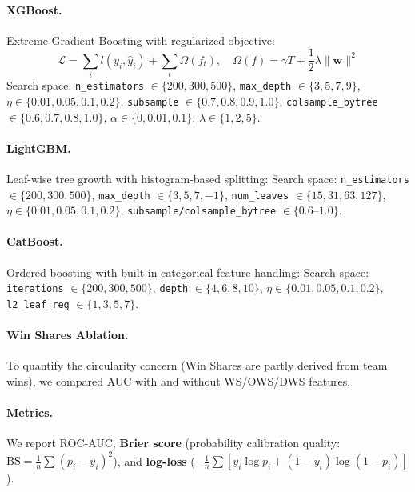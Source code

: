 \documentclass[12pt, a4paper]{article}
\begin{document}
\paragraph{XGBoost.} Extreme Gradient Boosting with regularized objective:
\begin{equation}
    \mathcal{L} = \sum_{i} l(y_i, \hat{y}_i) + \sum_{t} \Omega(f_t), \quad \Omega(f) = \gamma T + \frac{1}{2}\lambda \|\mathbf{w}\|^2
\end{equation}
Search space: \texttt{n\_estimators} $\in \{200, 300, 500\}$, \texttt{max\_depth} $\in \{3, 5, 7, 9\}$, $\eta \in \{0.01, 0.05, 0.1, 0.2\}$, \texttt{subsample} $\in \{0.7, 0.8, 0.9, 1.0\}$, \texttt{colsample\_bytree} $\in \{0.6, 0.7, 0.8, 1.0\}$, $\alpha \in \{0, 0.01, 0.1\}$, $\lambda \in \{1, 2, 5\}$.

\paragraph{LightGBM.} Leaf-wise tree growth with histogram-based splitting:
Search space: \texttt{n\_estimators} $\in \{200, 300, 500\}$, \texttt{max\_depth} $\in \{3, 5, 7, -1\}$, \texttt{num\_leaves} $\in \{15, 31, 63, 127\}$, $\eta \in \{0.01, 0.05, 0.1, 0.2\}$, \texttt{subsample/colsample\_bytree} $\in \{0.6\text{--}1.0\}$.

\paragraph{CatBoost.} Ordered boosting with built-in categorical feature handling:
Search space: \texttt{iterations} $\in \{200, 300, 500\}$, \texttt{depth} $\in \{4, 6, 8, 10\}$, $\eta \in \{0.01, 0.05, 0.1, 0.2\}$, \texttt{l2\_leaf\_reg} $\in \{1, 3, 5, 7\}$.

\paragraph{Win Shares Ablation.} To quantify the circularity concern (Win Shares are partly derived from team wins), we compared AUC with and without WS/OWS/DWS features.

\paragraph{Metrics.} We report ROC-AUC, \textbf{Brier score} (probability calibration quality: $\text{BS} = \frac{1}{n}\sum(p_i - y_i)^2$), and \textbf{log-loss} ($-\frac{1}{n}\sum[y_i \log p_i + (1-y_i)\log(1-p_i)]$).
\end{document}
